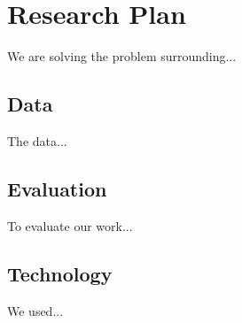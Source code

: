 \section{Research Plan}
\label{sec:research}

We are solving the problem surrounding...

\subsection{Data}
\label{sec:data}

The data...

\subsection{Evaluation}
\label{sec:eval}

To evaluate our work...

\subsection{Technology}
\label{sec:tech}

We used...
